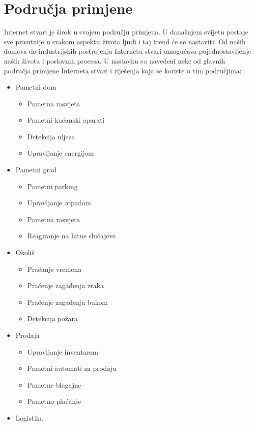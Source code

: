\documentclass[times, utf8, diplomski]{fer}
\begin{document}
\section{Područja primjene}
Internet stvari je širok u svojem području primjena. U današnjem svijetu postaje sve prisutnije u svakom aspektu života ljudi i taj trend će se nastaviti. Od naših domova do industrijskih postrojenja Internetu stvari omogućava pojednostavljenje naših života i poslovnih procesa. U nastavku su navedeni neke od glavnih područja primjene Interneta stvari i riješenja koja se koriste u tim područjima:
\begin{itemize}
    \item Pametni dom
    \begin{itemize}
        \item Pametna rasvjeta
        \item Pametni kućanski aparati
        \item Detekcija uljeza
        \item Upravljanje energijom
    \end{itemize}
    \item Pametni grad
    \begin{itemize}
        \item Pametni parking
        \item Upravljanje otpadom
        \item Pametna rasvjeta
        \item Reagiranje na hitne slučajeve
    \end{itemize}
    \item Okoliš
    \begin{itemize}
        \item Praćanje vremena
        \item Praćenje zagađenja zraka
        \item Praćenje zagađenja bukom
        \item Detekcija požara
    \end{itemize}
    \item Prodaja
    \begin{itemize}
        \item Upravljanje inventarom
        \item Pametni automati za prodaju
        \item Pametne blagajne
        \item Pametno plaćanje
    \end{itemize}
    \item Logistika

\end{itemize}
\end{document}
